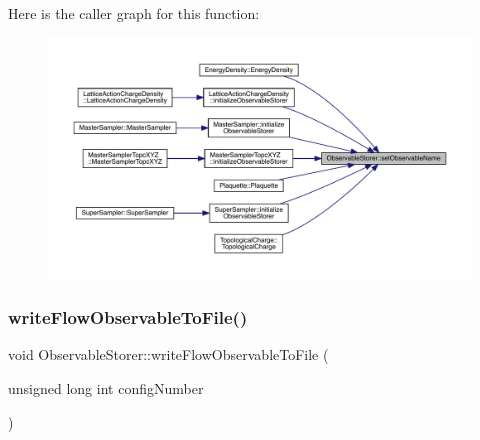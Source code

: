 Here is the caller graph for this function\+:\nopagebreak
\begin{figure}[H]
\begin{center}
\leavevmode
\includegraphics[width=350pt]{class_observable_storer_a7f4847c4fdbf8764d8f07950c4d4b62a_icgraph}
\end{center}
\end{figure}
\mbox{\label{class_observable_storer_af51ebd65eae2a5087cfd47ddf230da93}} 
\subsubsection{\texorpdfstring{writeFlowObservableToFile()}{writeFlowObservableToFile()}}
{\footnotesize\ttfamily void Observable\+Storer\+::write\+Flow\+Observable\+To\+File (\begin{DoxyParamCaption}\item[{unsigned long int}]{config\+Number }\end{DoxyParamCaption})}

